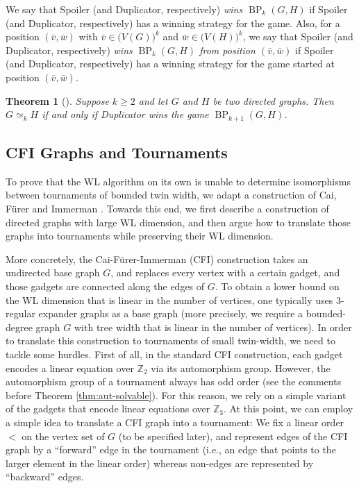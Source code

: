 \PassOptionsToPackage{dvipsnames,svgnames}{xcolor}\documentclass[10pt,a4paper]{article}
\newtheorem{theorem}{Theorem}[section]
\newcommand{\ZZ}{{\mathbb Z}}
\DeclareMathOperator{\BP}{BP}
\begin{document}
We say that Spoiler (and Duplicator, respectively) \emph{wins $\BP_k(G,H)$} if Spoiler (and Duplicator, respectively) has a winning strategy for the game.
Also, for a position $(\bar v,\bar w)$ with $\bar v \in \big(V(G)\big)^k$ and $\bar w \in \big(V(H)\big)^k$, we say that Spoiler (and Duplicator, respectively) \emph{wins $\BP_k(G,H)$ from position $(\bar v,\bar w)$} if Spoiler (and Duplicator, respectively) has a winning strategy for the game started at position $(\bar v,\bar w)$.

\begin{theorem}[\cite{CaiFI92,Hella96}]
 \label{thm:eq-wl-pebble}
 Suppose $k \geq 2$ and let $G$ and $H$ be two directed graphs.
 Then $G \simeq_k H$ if and only if Duplicator wins the game $\BP_{k+1}(G,H)$.
\end{theorem}


\subsection{CFI Graphs and Tournaments}

To prove that the WL algorithm on its own is unable to determine isomorphisms between tournaments of bounded twin width, we adapt a construction of Cai, F{\"{u}}rer and Immerman \cite{CaiFI92}.
Towards this end, we first describe a construction of directed graphs with large WL dimension, and then argue how to translate those graphs into tournaments while preserving their WL dimension.

More concretely, the Cai-F{\"{u}}rer-Immerman (CFI) construction \cite{CaiFI92} takes an undirected base graph $G$, and replaces every vertex with a certain gadget, and those gadgets are connected along the edges of $G$.
To obtain a lower bound on the WL dimension that is linear in the number of vertices, one typically uses $3$-regular expander graphs as a base graph (more precisely, we require a bounded-degree graph $G$ with tree width that is linear in the number of vertices).
In order to translate this construction to tournaments of small twin-width, we need to tackle some hurdles.
First of all, in the standard CFI construction, each gadget encodes a linear equation over $\ZZ_2$ via its automorphism group.
However, the automorphism group of a tournament always has odd order (see the comments before Theorem \ref{thm:aut-solvable}).
For this reason, we rely on a simple variant of the gadgets that encode linear equations over $\ZZ_3$.
At this point, we can employ a simple idea to translate a CFI graph into a tournament:
We fix a linear order $<$ on the vertex set of $G$ (to be specified later), and represent edges of the CFI graph by a ``forward'' edge in the tournament (i.e., an edge that points to the larger element in the linear order) whereas non-edges are represented by ``backward'' edges.
\end{document}
